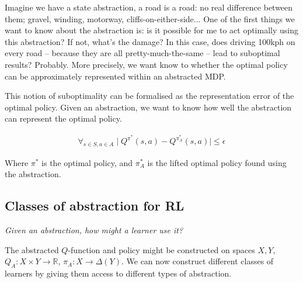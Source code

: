Imagine we have a state abstraction, a road is a road: no real difference
between them; gravel, winding, motorway, cliffs-on-either-side...
One of the first things we want to know about the abstraction is:
is it possible for me to act optimally
using this abstraction? If not, what's the damage? In this case, does driving 100kph on every road --
because they are all pretty-much-the-same -- lead to suboptimal results? Probably.
More precisely, we want know to whether the optimal policy can be approximately represented within an abstracted MDP.

This notion of suboptimality can be formalised as the representation error of the optimal
policy. Given an abstraction, we want to know how well
the abstraction can represent the optimal policy. \cite{Littman2006, Abel2017} \footnotemark[6]


\begin{align}
\forall_{s\in S, a\in A} \mid Q^{\pi^* }(s, a) - Q^{\pi_{A}^* }(s, a) \mid \le \epsilon
\end{align}

Where $\pi^{* }$ is the optimal policy, and $\pi_{A}^{* }$ is the lifted optimal
policy found using the abstraction.

\subsection{Classes of abstraction for RL}

%

\begin{displayquote}
\textit{Given an abstraction, how might a learner use it?}
\end{displayquote}

The abstracted $Q$-function and policy might be constructed on spaces $X, Y$,
$Q_A: X \times Y \to \mathbb R$, $\pi_A: X \to \Delta(Y)$. We can now construct
different classes of learners by giving them access to different types of abstraction.

